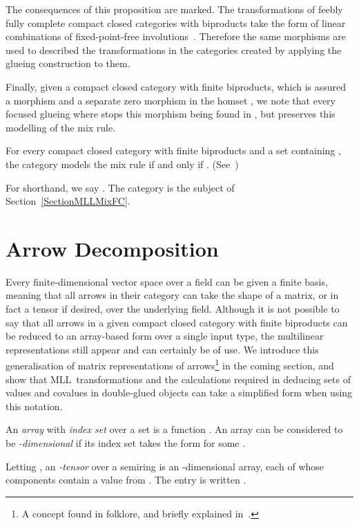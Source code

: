 \documentclass{LMCS}
\theoremstyle{plain}\newtheorem*{cLm}{Claim}
\newcommand{\mll}{MLL} \newcommand{\mall}{MALL}
\newcommand{\p}{} \newcommand{\N}{\mathbb{N}}
\newcommand{\hughd}[1]{#1}
\newcommand{\hughf}[1]{#1}
\newcommand{\hughh}[1]{#1}
\begin{document}
The consequences of this proposition are marked. The transformations of feebly fully complete compact closed categories with biproducts take the form of linear combinations of fixed-point-free involutions~\cite{CHS01}. Therefore the same morphisms are used to described the transformations in the categories created by applying the glueing construction to them.

\p Finally, given a compact closed category  with finite biproducts, which is assured a morphism  and a separate zero morphism  in the homset , we note that every focused glueing  where  stops this morphism being found in , but  preserves this modelling of the mix rule.
\begin{fact}
For every compact closed category  with finite biproducts and a set  containing , the category  models the mix rule if and only if . (See~\cite{Tan97})
\end{fact}

For shorthand, we say . The category is the subject of Section~\ref{SectionMLLMixFC}.

\section{Arrow Decomposition} \label{ArrowDecomp}

Every finite-dimensional vector space over a field  can be given a finite basis, meaning that all arrows in their category  can take the shape of a matrix, or in fact a tensor if desired, over the underlying field. Although it is not possible to say that all arrows in a given compact closed category with finite biproducts can be reduced to an array-based form over a single input type, the multilinear representations still appear and can certainly be of use. \hughd{We introduce this generalisation of matrix representations of arrows\footnote{\hughf{A concept found in folklore, and briefly explained in~\cite{Hou08}.}} in the coming section, and show that \hughh{\mll~transformations and the calculations required in deducing sets of values and covalues in double-glued objects can take a simplified form when using this notation.}}

\begin{defi}
An \emph{array} with \emph{index set}  over a set  is a function . An array can be considered to be \emph{-dimensional} if its index set takes the form  for some .
\end{defi}

\begin{defi}
Letting , an \emph{-tensor}  over a semiring  is an -dimensional array, each of whose components contain a value from . The  entry is written .
\end{defi}
\end{document}
